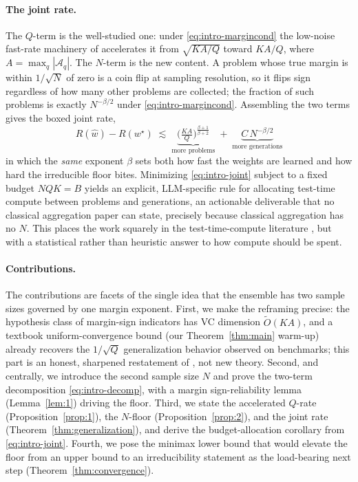 \documentclass{article} %
\providecommand{\Aq}{\mathcal{A}_q}
\providecommand{\what}{\widehat{w}}
\providecommand{\wstar}{w^{\star}}
\begin{document}
\paragraph{The joint rate.}
The $Q$-term is the well-studied one: under \eqref{eq:intro-margincond} the
low-noise fast-rate machinery of \citet{mammen1999smooth,tsybakov2004optimal}
accelerates it from $\sqrt{KA/Q}$ toward $KA/Q$, where $A=\max_q|\Aq|$. The
$N$-term is the new content. A problem whose true margin is within $1/\sqrt N$
of zero is a coin flip at sampling resolution, so it flips sign regardless of how
many other problems are collected; the fraction of such problems is exactly
$N^{-\beta/2}$ under \eqref{eq:intro-margincond}. Assembling the two terms
gives the boxed joint rate,
\begin{equation}
\label{eq:intro-joint}
\boxed{\;
R(\what)-R(\wstar) \;\lesssim\;
\underbrace{\Big(\tfrac{KA}{Q}\Big)^{\frac{\beta+1}{\beta+2}}}_{\text{more problems}}
\;+\;
\underbrace{C\,N^{-\beta/2}}_{\text{more generations}}\; }
\end{equation}
in which the \emph{same} exponent $\beta$ sets both how fast the weights are
learned and how hard the irreducible floor bites. Minimizing
\eqref{eq:intro-joint} subject to a fixed budget $NQK=B$ yields an explicit,
LLM-specific rule for allocating test-time compute between problems and
generations, an actionable deliverable that no classical aggregation paper can
state, precisely because classical aggregation has no $N$. This places the work
squarely in the test-time-compute literature
\citep{brown2024largelm,snell2025scalinglt,wu2024inferencesl,wang2022selfconsistencyic},
but with a statistical rather than heuristic answer to how compute should be spent.

\paragraph{Contributions.}
The contributions are facets of the single idea that the ensemble has two sample
sizes governed by one margin exponent. First, we make the reframing precise: the
hypothesis class of margin-sign indicators has VC dimension $\tilde O(KA)$, and a
textbook uniform-convergence bound (our Theorem~\ref{thm:main} warm-up) already
recovers the $1/\sqrt Q$ generalization behavior observed on benchmarks; this part
is an honest, sharpened restatement of \citet{komiyama2026best}, not new theory.
Second, and centrally, we introduce the second sample size $N$ and prove the
two-term decomposition \eqref{eq:intro-decomp}, with a margin sign-reliability
lemma (Lemma~\ref{lem:1}) driving the floor. Third, we state the accelerated
$Q$-rate (Proposition~\ref{prop:1}), the $N$-floor (Proposition~\ref{prop:2}), and
the joint rate (Theorem~\ref{thm:generalization}), and derive the budget-allocation
corollary from \eqref{eq:intro-joint}. Fourth, we pose the minimax lower bound
that would elevate the floor from an upper bound to an irreducibility statement as
the load-bearing next step (Theorem~\ref{thm:convergence}).
\end{document}
